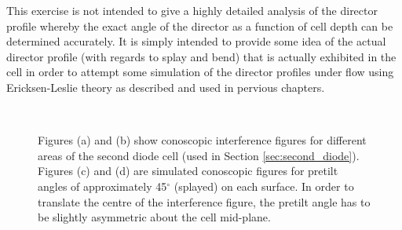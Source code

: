This exercise is not intended to give a highly detailed analysis of the director profile whereby the exact angle of the director as a function of cell depth can be determined accurately. It is simply intended to provide some idea of the actual director profile (with regards to splay and bend) that is actually exhibited in the cell in order to attempt some simulation of the director profiles under flow using Ericksen-Leslie theory as described and used in pervious chapters.

\begin{figure}
\begin{center}
\\
\end{center}
\caption[Comparison between experimental and simulated splayed conoscopic figures]{\label{fig:diode_director}Figures (a) and (b) show conoscopic interference figures for different areas of the second diode cell (used in Section \ref{sec:second_diode}). Figures (c) and (d) are simulated conoscopic figures for pretilt angles of approximately 45$^{\circ}$ (splayed) on each surface. In order to translate the centre of the interference figure, the pretilt angle has to be slightly asymmetric about the cell mid-plane.}
\end{figure}

